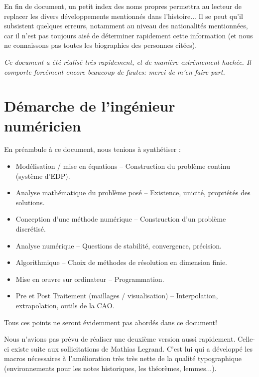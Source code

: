 \documentclass[11pt,pdflatex]{book}
\begin{document}
\medskip
En fin de document, un petit index des noms propres permettra au lecteur
de replacer les divers développements mentionnés dans l'histoire...
Il se peut qu'il subsistent quelques erreurs, notamment au niveau des
nationalités mentionnées, car il n'est pas toujours aisé de déterminer rapidement cette 
information (et nous ne connaissons pas toutes les biographies des personnes citées).

\medskip
\emph{Ce document a été réalisé très rapidement, et de manière extrêmement hachée.
Il comporte forcément encore beaucoup de fautes: merci de m'en faire part.}




\bigskip
\section*{Démarche de l'ingénieur numéricien}

En préambule à ce document, nous tenions à synthétiser :
\begin{itemize}
   \item Modélisation / mise en équations -- Construction du problème continu (système d'EDP).
   \item Analyse mathématique du problème posé -- Existence, unicité, propriétés des solutions.
   \item Conception d'une méthode numérique -- Construction d'un problème discrétisé.
   \item Analyse numérique -- Questions de stabilité, convergence, précision.
   \item Algorithmique -- Choix de méthodes de résolution en dimension finie.
   \item Mise en œuvre sur ordinateur -- Programmation.
   \item Pre et Post Traitement (maillages / visualisation) -- Interpolation, extrapolation, outils de la CAO.
\end{itemize}

\medskip
Tous ces points ne seront évidemment pas abordés dans ce document!
\vfill
\noindent
{}

Nous n'avions pas prévu de réaliser une deuxième version aussi rapidement.
Celle-ci existe suite aux sollicitations de Mathias Legrand.
C'est lui  qui a développé les macros nécessaires à l'amélioration très très nette de la 
qualité typographique (environnements pour les notes historiques, les théorèmes, lemmes...).
\end{document}
